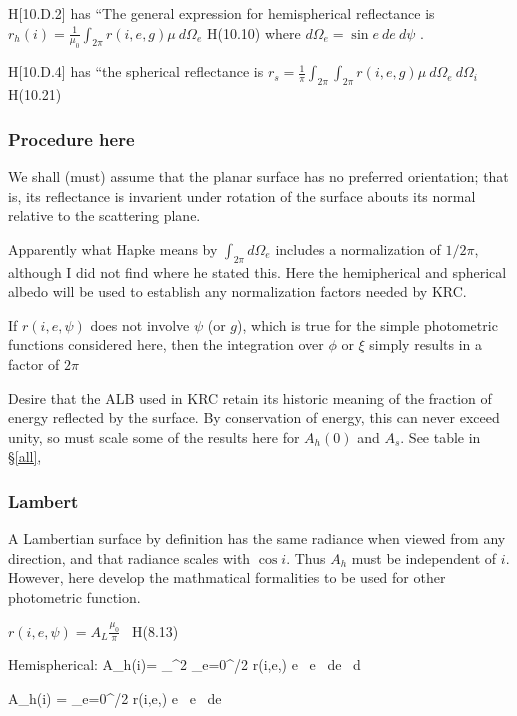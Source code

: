H[10.D.2] has ``The general expression for hemispherical reflectance is
$r_h(i)= \frac{1}{\mu_0} \int_{2 \pi} r(i,e,g) \mu \ d\Omega_e $ H(10.10) where
$d\Omega_e = \sin e \ d e \ d \psi$ .

 H[10.D.4] has ``the spherical reflectance is $r_s= \frac{1}{\pi} \int_{2 \pi}  \int_{2 \pi}  r(i,e,g) \mu \ d\Omega_e  \ d\Omega_i $ H(10.21)

\subsubsection{Procedure here} %
We shall (must) assume that the planar surface has no preferred orientation;
that is, its reflectance is invarient under rotation of the surface abouts its
normal relative to the scattering plane.

Apparently what Hapke means by $\int_{2 \pi} d\Omega_e$ includes a normalization
of $1/2\pi$, although I did not find where he stated this.  Here the
hemipherical and spherical albedo will be used to establish any normalization
factors needed by KRC.

If $ r(i,e,\psi)$ does not involve $\psi$ (or $g$), which is true for the simple
photometric functions considered here, then the integration over $\phi$ or $\xi$
simply results in a factor of $2 \pi$

Desire that the ALB used in KRC retain its historic meaning of the fraction of
energy reflected by the surface. By conservation of energy, this can never
exceed unity, so must scale some of the results here for $A_h(0)$ and $A_s$. See
table in \S \ref{all},

\subsubsection{Lambert}
  A Lambertian surface by definition has the same radiance when viewed from any
  direction, and that radiance scales with $\cos i$. Thus $A_h$ must be
  independent of $i$. However, here develop the mathmatical formalities to be
  used for other photometric function.

$ r(i,e,\psi)=A_L \frac{\mu_0}{\pi}$ \ H(8.13)

Hemispherical:
\qbn A_h(i)=   \int_{}^{2\pi} \int_{e=0}^{\pi/2} r(i,e,\psi) \cdot \cos e \ \sin e \ de \ d\psi {}

\qbn A_h(i) =  \int_{e=0}^{\pi/2}  r(i,e,\psi) \cdot \cos e \ \sin e \ de 

